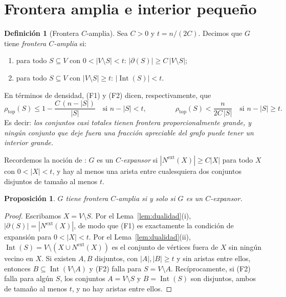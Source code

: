\documentclass[11pt,a4paper]{article}
\newtheorem{proposicion}[teorema]{Proposición}
\theoremstyle{definition}
\newtheorem{definicion}[teorema]{Definición}
\theoremstyle{remark}
\newcommand{\Int}{\operatorname{Int}}
\newcommand{\rtop}{\rho_{\mathrm{top}}}
\newcommand{\Nx}{N^{\mathrm{ext}}}
\begin{document}
\section{Frontera amplia e interior pequeño}\label{sec:expansion}

\begin{definicion}[Frontera $C$-amplia]
Sea $C>0$ y $t=n/(2C)$. Decimos que $G$ tiene \emph{frontera $C$-amplia} si:
\begin{enumerate}[label=(F\arabic*)]
\item para todo $S\subseteq V$ con $0<|V\setminus S|<t$: \quad $|\partial(S)|\ge C\,|V\setminus S|$;
\item para todo $S\subseteq V$ con $|V\setminus S|\ge t$: \quad $|\Int(S)|<t$.
\end{enumerate}
\end{definicion}

En términos de densidad, (F1) y (F2) dicen, respectivamente, que
\[
\rtop(S)\le 1-\frac{C\,(n-|S|)}{|S|}\quad\text{si } n-|S|<t,
\qquad\qquad
\rtop(S)<\frac{n}{2C\,|S|}\quad\text{si } n-|S|\ge t .
\]
Es decir: \emph{los conjuntos casi totales tienen frontera proporcionalmente grande, y ningún conjunto que deje fuera una fracción apreciable del grafo puede tener un interior grande.}

Recordemos la noción de \cite{dmmps}: $G$ es un \emph{$C$-expansor} si $|\Nx(X)|\ge C|X|$ para todo $X$ con $0<|X|<t$, y hay al menos una arista entre cualesquiera dos conjuntos disjuntos de tamaño al menos $t$.

\begin{proposicion}\label{prop:equiv}
$G$ tiene frontera $C$-amplia si y solo si $G$ es un $C$-expansor.
\end{proposicion}

\begin{proof}
Escribamos $X=V\setminus S$. Por el Lema~\ref{lem:dualidad}(i), $|\partial(S)|=|\Nx(X)|$, de modo que (F1) es exactamente la condición de expansión para $0<|X|<t$.
Por el Lema~\ref{lem:dualidad}(ii), $\Int(S)=V\setminus(X\cup\Nx(X))$ es el conjunto de vértices fuera de $X$ sin ningún vecino en $X$. Si existen $A,B$ disjuntos, con $|A|,|B|\ge t$ y sin aristas entre ellos, entonces $B\subseteq \Int(V\setminus A)$ y (F2) falla para $S=V\setminus A$. Recíprocamente, si (F2) falla para algún $S$, los conjuntos $A=V\setminus S$ y $B=\Int(S)$ son disjuntos, ambos de tamaño al menos $t$, y no hay aristas entre ellos.
\end{proof}
\end{document}
